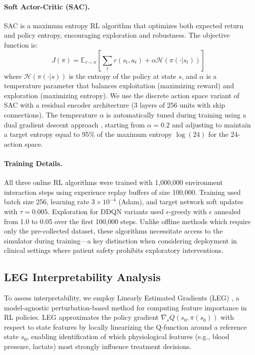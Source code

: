 \paragraph{Soft Actor-Critic (SAC).}
SAC \citep{haarnoja2018soft} is a maximum entropy RL algorithm that optimizes both expected return and policy entropy, encouraging exploration and robustness. The objective function is:
\begin{equation}
J(\pi) = \mathbb{E}_{\tau \sim \pi}\left[\sum_t r(s_t, a_t) + \alpha \mathcal{H}(\pi(\cdot|s_t))\right]
\end{equation}
where $\mathcal{H}(\pi(\cdot|s))$ is the entropy of the policy at state $s$, and $\alpha$ is a temperature parameter that balances exploitation (maximizing reward) and exploration (maximizing entropy). We use the discrete action space variant of SAC with a residual encoder architecture (3 layers of 256 units with skip connections). The temperature $\alpha$ is automatically tuned during training using a dual gradient descent approach \citep{haarnoja2018soft_applications}, starting from $\alpha = 0.2$ and adjusting to maintain a target entropy equal to 95\% of the maximum entropy $\log(24)$ for the 24-action space.

\paragraph{Training Details.}
All three online RL algorithms were trained with 1,000,000 environment interaction steps using experience replay buffers of size 100,000. Training used batch size 256, learning rate $3 \times 10^{-4}$ (Adam), and target network soft updates with $\tau = 0.005$. Exploration for DDQN variants used $\epsilon$-greedy with $\epsilon$ annealed from 1.0 to 0.05 over the first 100,000 steps. Unlike offline methods which require only the pre-collected dataset, these algorithms necessitate access to the simulator during training—a key distinction when considering deployment in clinical settings where patient safety prohibits exploratory interventions.

\subsection{LEG Interpretability Analysis}\label{sec:methods:leg}

To assess interpretability, we employ Linearly Estimated Gradients (LEG) \citep{greydanus2018leg}, a model-agnostic perturbation-based method for computing feature importance in RL policies. LEG approximates the policy gradient $\nabla_s Q(s_0, \pi(s_0))$ with respect to state features by locally linearizing the Q-function around a reference state $s_0$, enabling identification of which physiological features (e.g., blood pressure, lactate) most strongly influence treatment decisions.

